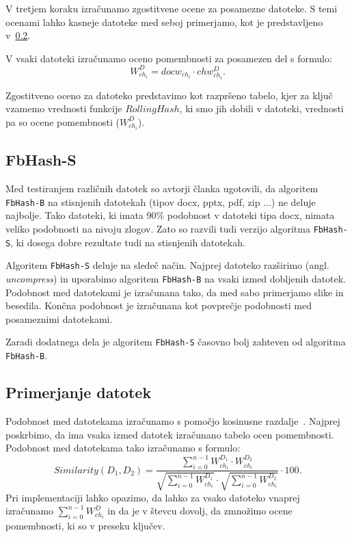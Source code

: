 \documentclass{acm_proc_article-sp}
\begin{document}
V tretjem koraku izračunamo zgostitvene ocene za posamezne datoteke. S temi ocenami lahko kasneje datoteke med seboj primerjamo, kot je predstavljeno v~\ref{doc-compare}.

V vsaki datoteki izračunamo oceno pomembnosti za posamezen del s formulo: \begin{displaymath}  W_{ch_i}^D = docw_{ch_i} \cdot chw_{ch_i}^D. \end{displaymath}

Zgostitveno oceno za datoteko predstavimo kot razpršeno tabelo, kjer za ključ vzamemo vrednosti funkcije $RollingHash$, ki smo jih dobili v datoteki, vrednosti pa so ocene pomembnosti ($W_{ch_i}^D$).

\subsection{FbHash-S}

Med testiranjem različnih datotek so avtorji članka ugotovili, da algoritem \texttt{FbHash-B} na stisnjenih datotekah (tipov docx, pptx, pdf, zip ...) ne deluje najbolje. Tako datoteki, ki imata $90$\% podobnost v datoteki tipa docx, nimata veliko podobnosti na nivoju zlogov. Zato so razvili tudi verzijo algoritma \texttt{FbHash-S}, ki dosega dobre rezultate tudi na stisnjenih datotekah.

Algoritem \texttt{FbHash-S} deluje na sledeč način. Najprej datoteko razširimo (angl. \emph{uncompress}) in uporabimo algoritem \texttt{FbHash-B} na vsaki izmed dobljenih datotek. Podobnost med datotekami je izračunana tako, da med sabo primerjamo slike in besedila. Končna podobnost je izračunana kot povprečje podobnosti med posameznimi datotekami.

Zaradi dodatnega dela je algoritem \texttt{FbHash-S} časovno bolj zahteven od algoritma \texttt{FbHash-B}.

\subsection{Primerjanje datotek}
\label{doc-compare}

Podobnost med datotekama izračunamo s pomočjo kosinusne razdalje~\cite{Salton88term-weightingapproaches}. Najprej poskrbimo, da ima vsaka izmed datotek izračunano tabelo ocen pomembnosti. Podobnost med datotekama tako izračunamo s formulo: \begin{displaymath} Similarity(D_1, D_2)=\frac{\sum_{i=0}^{n-1} W_{ch_i}^{D_1} \cdot W_{ch_i}^{D_2}}{\sqrt{\sum_{i=0}^{n-1} W_{ch_i}^{D_1}}\cdot\sqrt{\sum_{i=0}^{n-1} W_{ch_i}^{D_2}}}\cdot 100. \end{displaymath} Pri implementaciji lahko opazimo, da lahko za vsako datoteko vnaprej izračunamo $\sum_{i=0}^{n-1} W_{ch_i}^{D}$ in da je v števcu dovolj, da zmnožimo ocene pomembnosti, ki so v preseku ključev.
\end{document}
